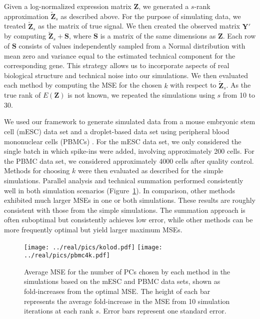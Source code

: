 \documentclass[10pt,letterpaper]{article}
\begin{document}
Given a log-normalized expression matrix $\mathbf{Z}$, we generated a $s$-rank approximation $\mathbf{\tilde Z}_{s}$ as described above.
For the purpose of simulating data, we treated $\mathbf{\tilde Z}_{s}$ as the matrix of true signal.
We then created the observed matrix $\mathbf{Y}'$ by computing $\mathbf{\tilde Z}_{s} + \mathbf{S}$, where $\mathbf{S}$ is a matrix of the same dimensions as $\mathbf{Z}$.
Each row of $\mathbf{S}$ consists of values independently sampled from a Normal distribution with mean zero and variance equal to the estimated technical component for the corresponding gene.
This strategy allows us to incorporate aspects of real biological structure and technical noise into our simulations.
We then evaluated each method by computing the MSE for the chosen $k$ with respect to $\mathbf{\tilde Z}_s$.
As the true rank of $E(\mathbf{Z})$ is not known, we repeated the simulations using $s$ from 10 to 30.

We used our framework to generate simulated data from a mouse embryonic stem cell (mESC) data set \cite{kolod2015single} and a droplet-based data set using peripheral blood mononuclear cells (PBMCs) \cite{zheng2017massively}.
For the mESC data set, we only considered the single batch in which spike-ins were added, involving approximately 200 cells.
For the PBMC data set, we considered approximately 4000 cells after quality control.
Methods for choosing $k$ were then evaluated as described for the simple simulations.
Parallel analysis and technical summation performed consistently well in both simulation scenarios (Figure~\ref{fig:real}).
In comparison, other methods exhibited much larger MSEs in one or both simulations.
These results are roughly consistent with those from the simple simulations.
The summation approach is often suboptimal but consistently achieves low error, while other methods can be more frequently optimal but yield larger maximum MSEs.

\begin{figure}[btp]
\begin{center}
\texttt{[image: ../real/pics/kolod.pdf]}
\texttt{[image: ../real/pics/pbmc4k.pdf]}
\end{center}
\caption{Average MSE for the number of PCs chosen by each method in the simulations based on the mESC and PBMC data sets, shown as fold-increases from the optimal MSE.
The height of each bar represents the average fold-increase in the MSE from 10 simulation iterations at each rank $s$.
Error bars represent one standard error.}
\label{fig:real}
\end{figure}
\end{document}
